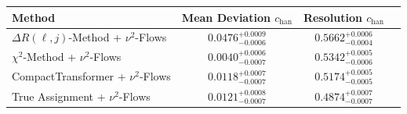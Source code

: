     \begin{tabular}{lccc}
        \toprule
        Method & Mean Deviation $c_{\text{han}}$ & Resolution $c_{\text{han}}$ \\
        \midrule
        $\Delta R(\ell,j)$-Method + $\nu^2$-Flows & $0.0476^{+0.0009}_{-0.0006}$ & $0.5662^{+0.0006}_{-0.0004}$ \\
        $\chi^2$-Method + $\nu^2$-Flows & $0.0040^{+0.0006}_{-0.0007}$ & $0.5342^{+0.0005}_{-0.0006}$ \\
        CompactTransformer + $\nu^2$-Flows & $0.0118^{+0.0007}_{-0.0007}$ & $0.5174^{+0.0005}_{-0.0005}$ \\
        True Assignment + $\nu^2$-Flows & $0.0121^{+0.0008}_{-0.0007}$ & $0.4874^{+0.0007}_{-0.0007}$ \\
        \bottomrule
    \end{tabular}